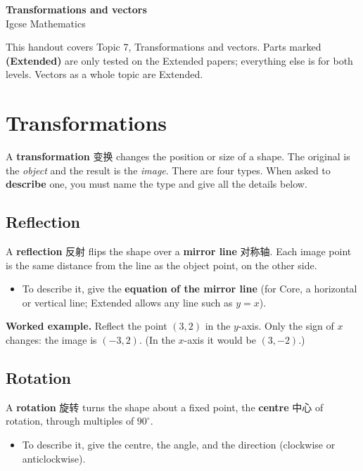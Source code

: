 \documentclass[11pt]{article}
\begin{document}
\begin{center}
  {\LARGE\bfseries Transformations and vectors}\\[0.35em]
  {\large Igcse Mathematics}
\end{center}
\vspace{0.6em}

This handout covers Topic 7, Transformations and vectors. Parts marked \textbf{(Extended)} are only tested on the Extended papers; everything else is for both levels. Vectors as a whole topic are Extended.

\section*{Transformations}

A \textbf{transformation} 变换 changes the position or size of a shape. The original is the \emph{object} and the result is the \emph{image}. There are four types. When asked to \textbf{describe} one, you must name the type and give all the details below.

\subsection*{Reflection}

A \textbf{reflection} 反射 flips the shape over a \textbf{mirror line} 对称轴. Each image point is the same distance from the line as the object point, on the other side.

\begin{itemize}
\item To describe it, give the \textbf{equation of the mirror line} (for Core, a horizontal or vertical line; Extended allows any line such as $y = x$).

\end{itemize}

\textbf{Worked example.} Reflect the point $(3, 2)$ in the $y$-axis. Only the sign of $x$ changes: the image is $(-3, 2)$. (In the $x$-axis it would be $(3, -2)$.)

\subsection*{Rotation}

A \textbf{rotation} 旋转 turns the shape about a fixed point, the \textbf{centre} 中心 of rotation, through multiples of $90^{\circ}$.

\begin{itemize}
\item To describe it, give the centre, the angle, and the direction (clockwise or anticlockwise).

\end{itemize}
\end{document}
